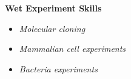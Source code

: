 \textbf{Wet Experiment Skills}
\vspace{-1em}
\begin{multicols}{3}
\begin{itemize}
    \item \textit{Molecular cloning}
\end{itemize}  
  
\columnbreak %

\begin{minipage}[t]{0.35\textwidth} %
    \begin{itemize} 
        \item \textit{Mammalian cell experiments}
    \end{itemize}
\end{minipage}  


\columnbreak %
  
\begin{itemize} 
    \item \textit{Bacteria experiments}
\end{itemize}  
\end{multicols}
\vspace{-1em}